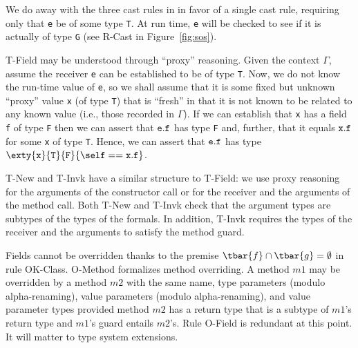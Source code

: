 

We do away with the three cast rules in \FJ{} in favor of a single
cast rule, requiring only that {\tt e} be of some type {\tt T}. At run time,
{\tt e} will be checked to see if it is actually of type {\tt G} (see
{\sc R-Cast} in Figure~\ref{fig:sos}).

{\sc T-Field} may be understood through ``proxy'' reasoning.
Given the context $\Gamma$, assume the receiver {\tt e} can
be established to be of type {\tt T}. Now, we do not know the run-time
value of {\tt e}, so we shall assume that it is some fixed but unknown
``proxy'' value {\tt x} (of type {\tt T}) that is ``fresh'' in that it
is not known to be related to any known value (i.e., those recorded
in $\Gamma$).  If we can establish that {\tt x} has a field {\tt f} of
type {\tt F} then we can assert that
${\tt e}.{\tt f}$ has type {\tt F} and, further, that it equals ${\tt x}.{\tt f}$
for some {\tt x} of type {\tt T}.
Hence, we can assert that ${\tt e}.{\tt f}$ has type 
$\exty{\tt x}{\tt T}{\tt F}\{\self=={\tt x}.{\tt f}\}$.

{\sc T-New} and {\sc T-Invk} have a similar structure to {\sc T-Field}: we use
proxy reasoning for the arguments of the constructor call or for the receiver and the arguments of the method
call. Both {\sc T-New} and {\sc T-Invk} check that the argument types are subtypes of the types of the formals.
In addition, {\sc T-Invk} requires the types of the receiver and the arguments to satisfy the method guard.

Fields cannot be overridden thanks to the premise $\tbar{f}\cap\tbar{g}=\emptyset$ in rule {\sc OK-Class}. {\sc O-Method} formalizes method overriding. A method $m1$ may be overridden by a method $m2$ with the same name, type parameters (modulo alpha-renaming), value parameters (modulo alpha-renaming), and value parameter types provided method $m2$ has a return type that is a subtype of $m1$'s return type and $m1$'s guard entails $m2$'s. Rule {\sc O-Field} is redundant at this point. It will matter to type system extensions.

